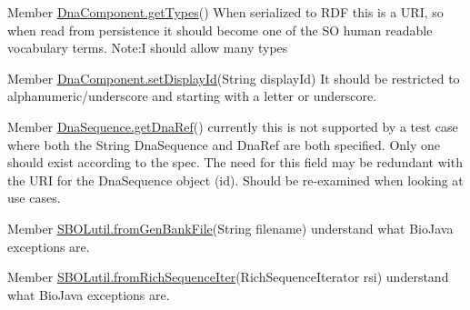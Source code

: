 \label{todo__todo000002}
\hypertarget{todo__todo000002}{}
 
\begin{DoxyDescription}
\item[Member \hyperlink{classorg_1_1sbolstandard_1_1lib_s_b_o_lj_1_1_dna_component_a518b97368db3de477d5fb57150d8b711}{DnaComponent.getTypes}() ]When serialized to RDF this is a URI, so when read from persistence it should become one of the SO human readable vocabulary terms. Note:I should allow many types 
\end{DoxyDescription}

\label{todo__todo000001}
\hypertarget{todo__todo000001}{}
 
\begin{DoxyDescription}
\item[Member \hyperlink{classorg_1_1sbolstandard_1_1lib_s_b_o_lj_1_1_dna_component_a46b93a70e7bd612a7b429aac4829bc88}{DnaComponent.setDisplayId}(String displayId) ]It should be restricted to alphanumeric/underscore and starting with a letter or underscore. 
\end{DoxyDescription}

\label{todo__todo000003}
\hypertarget{todo__todo000003}{}
 
\begin{DoxyDescription}
\item[Member \hyperlink{classorg_1_1sbolstandard_1_1lib_s_b_o_lj_1_1_dna_sequence_aa65410fe45bf6277117ef6a880e6ddce}{DnaSequence.getDnaRef}() ]currently this is not supported by a test case where both the String DnaSequence and DnaRef are both specified. Only one should exist according to the spec. The need for this field may be redundant with the URI for the DnaSequence object (id). Should be re-\/examined when looking at use cases. 
\end{DoxyDescription}

\label{todo__todo000004}
\hypertarget{todo__todo000004}{}
 
\begin{DoxyDescription}
\item[Member \hyperlink{classorg_1_1sbolstandard_1_1lib_s_b_o_lj_1_1_s_b_o_lutil_ab30e7fc9ccb218e864e45cad4366304a}{SBOLutil.fromGenBankFile}(String filename) ]understand what BioJava exceptions are. 
\end{DoxyDescription}

\label{todo__todo000005}
\hypertarget{todo__todo000005}{}
 
\begin{DoxyDescription}
\item[Member \hyperlink{classorg_1_1sbolstandard_1_1lib_s_b_o_lj_1_1_s_b_o_lutil_a375e674a9edc77307e250df41d76f02d}{SBOLutil.fromRichSequenceIter}(RichSequenceIterator rsi) ]understand what BioJava exceptions are. 
\end{DoxyDescription}

